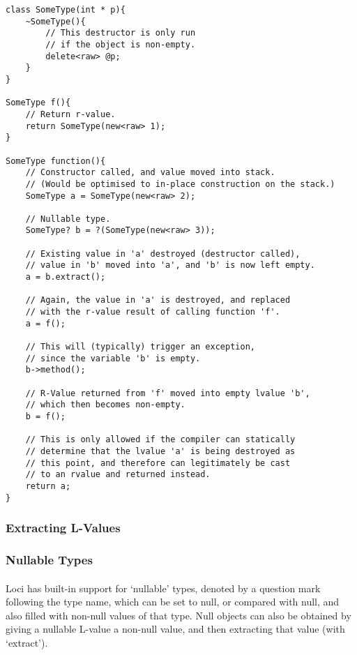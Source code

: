 \documentclass[12pt,twoside,notitlepage]{report}
\begin{document}
\begin{lstlisting}
class SomeType(int * p){
	~SomeType(){
		// This destructor is only run
		// if the object is non-empty.
		delete<raw> @p;
	}
}

SomeType f(){
	// Return r-value.
	return SomeType(new<raw> 1);
}

SomeType function(){
	// Constructor called, and value moved into stack.
	// (Would be optimised to in-place construction on the stack.)
	SomeType a = SomeType(new<raw> 2);
	
	// Nullable type.
	SomeType? b = ?(SomeType(new<raw> 3));
	
	// Existing value in 'a' destroyed (destructor called),
	// value in 'b' moved into 'a', and 'b' is now left empty.
	a = b.extract();
	
	// Again, the value in 'a' is destroyed, and replaced
	// with the r-value result of calling function 'f'.
	a = f();
	
	// This will (typically) trigger an exception,
	// since the variable 'b' is empty.
	b->method();
	
	// R-Value returned from 'f' moved into empty lvalue 'b',
	// which then becomes non-empty.
	b = f();
	
	// This is only allowed if the compiler can statically
	// determine that the lvalue 'a' is being destroyed as
	// this point, and therefore can legitimately be cast
	// to an rvalue and returned instead.
	return a;
}
\end{lstlisting}


\subsubsection{Extracting L-Values}

\paragraph{}


\subsubsection{Nullable Types}

\paragraph{}
Loci has built-in support for `nullable' types, denoted by a question mark following the type name, which can be set to null, or compared with null, and also filled with non-null values of that type. Null objects can also be obtained by giving a nullable L-value a non-null value, and then extracting that value (with `extract').
\end{document}
